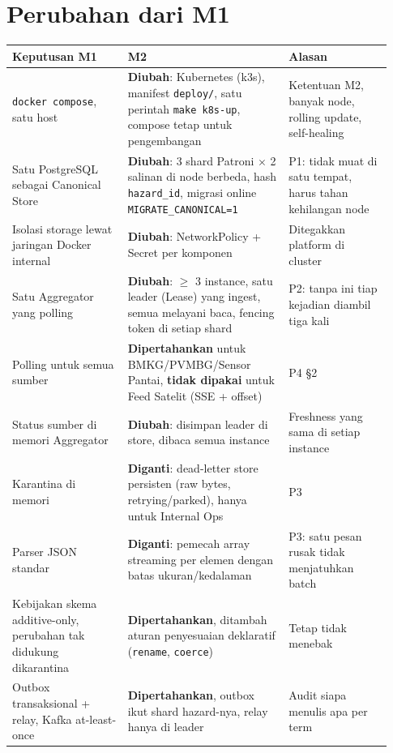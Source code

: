 \section{Perubahan dari M1}

{\small
\begin{longtable}{@{}>{\raggedright\arraybackslash}p{0.284\linewidth}>{\raggedright\arraybackslash}p{0.398\linewidth}>{\raggedright\arraybackslash}p{0.252\linewidth}@{}}
\toprule
\textbf{Keputusan M1} & \textbf{M2} & \textbf{Alasan} \\
\midrule
\endhead
\texttt{docker compose}, satu host & \textbf{Diubah}: Kubernetes (k3s), manifest \texttt{deploy/\allowbreak{}}, satu perintah \texttt{make k8s-\allowbreak{}up}, compose tetap untuk pengembangan & Ketentuan M2, banyak node, rolling update, self-healing \\
Satu PostgreSQL sebagai Canonical Store & \textbf{Diubah}: 3 shard Patroni $\times$ 2 salinan di node berbeda, hash \texttt{hazard\_\allowbreak{}id}, migrasi online \texttt{MIGRATE\_\allowbreak{}CANONICAL=\allowbreak{}1} & P1: tidak muat di satu tempat, harus tahan kehilangan node \\
Isolasi storage lewat jaringan Docker internal & \textbf{Diubah}: NetworkPolicy + Secret per komponen & Ditegakkan platform di cluster \\
Satu Aggregator yang polling & \textbf{Diubah}: $\ge$ 3 instance, satu leader (Lease) yang ingest, semua melayani baca, fencing token di setiap shard & P2: tanpa ini tiap kejadian diambil tiga kali \\
Polling untuk semua sumber & \textbf{Dipertahankan} untuk BMKG/PVMBG/Sensor Pantai, \textbf{tidak dipakai} untuk Feed Satelit (SSE + offset) & P4 §2 \\
Status sumber di memori Aggregator & \textbf{Diubah}: disimpan leader di store, dibaca semua instance & Freshness yang sama di setiap instance \\
Karantina di memori & \textbf{Diganti}: dead-letter store persisten (raw bytes, retrying/parked), hanya untuk Internal Ops & P3 \\
Parser JSON standar & \textbf{Diganti}: pemecah array streaming per elemen dengan batas ukuran/kedalaman & P3: satu pesan rusak tidak menjatuhkan batch \\
Kebijakan skema additive-only, perubahan tak didukung dikarantina & \textbf{Dipertahankan}, ditambah aturan penyesuaian deklaratif (\texttt{rename}, \texttt{coerce}) & Tetap tidak menebak \\
Outbox transaksional + relay, Kafka at-least-once & \textbf{Dipertahankan}, outbox ikut shard hazard-nya, relay hanya di leader & Audit siapa menulis apa per term \\

\end{longtable}}
